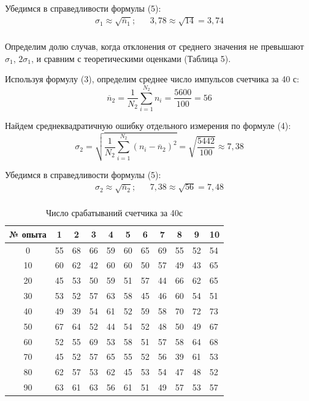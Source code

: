 \documentclass[a4paper,12pt]{article} %
\begin{document}
Убедимся в справедливости формулы (5):
\[
\begin{aligned}
\sigma_1 \approx \sqrt{\overline{n}_1}; &  & 3,78 \approx \sqrt{14} = 3,74\\
\end{aligned}
\]

Определим долю случав, когда отклонения от среднего значения не превышают $\sigma_1$, $2\sigma_1$, и сравним с теоретическими оценками (Таблица 5).

Используя формулу (3), определим среднее число импульсов счетчика за 40 с:
\[\overline{n}_2 = \frac{1}{N_2}\sum_{i=1}^{N_2}n_i = \frac{5600}{100}=56\]

Найдем среднеквадратичную ошибку отдельного измерения по формуле (4):
\[\sigma_2 = \sqrt{\frac{1}{N_2}\sum_{i=1}^{N_2}(n_i-\overline{n}_2)^2}=\sqrt{\frac{5442}{100}} \approx 7,38\]

Убедимся в справедливости формулы (5):
\[
\begin{aligned}
\sigma_2 \approx \sqrt{\overline{n}_2}; &  & 7,38 \approx \sqrt{56} = 7,48\\
\end{aligned}
\]
\newpage
\begin{table}[h]
\centering
\caption{Число срабатываний счетчика за 40с}
\label{table 3}
\renewcommand{\tabcolsep}{2mm}
\begin{tabular}{|c|l|l|l|l|l|l|l|l|l|l|}
\hline
№ опыта & \multicolumn{1}{c|}{1} & \multicolumn{1}{c|}{2} & \multicolumn{1}{c|}{3} & \multicolumn{1}{c|}{4} & \multicolumn{1}{c|}{5} & \multicolumn{1}{c|}{6} & \multicolumn{1}{c|}{7} & \multicolumn{1}{c|}{8} & \multicolumn{1}{c|}{9} & \multicolumn{1}{c|}{10} \\ \hline
0  & 55 & 68 & 66 & 59 & 60 & 65 & 69 & 55 & 52 & 54 \\ \hline
10 & 60 & 62 & 42 & 60 & 60 & 50 & 57 & 49 & 43 & 65 \\ \hline
20 & 45 & 53 & 50 & 59 & 51 & 57 & 44 & 66 & 62 & 65 \\ \hline
30 & 53 & 52 & 57 & 63 & 58 & 45 & 46 & 60 & 54 & 51 \\ \hline
40 & 49 & 39 & 54 & 61 & 52 & 59 & 58 & 70 & 72 & 73 \\ \hline
50 & 67 & 64 & 52 & 44 & 54 & 52 & 48 & 50 & 49 & 67 \\ \hline
60 & 52 & 55 & 69 & 53 & 58 & 51 & 57 & 58 & 64 & 68 \\ \hline
70 & 45 & 52 & 57 & 65 & 55 & 52 & 56 & 39 & 61 & 53 \\ \hline
80 & 62 & 57 & 53 & 62 & 45 & 53 & 54 & 47 & 48 & 52 \\ \hline
90 & 63 & 61 & 63 & 56 & 61 & 51 & 49 & 57 & 53 & 57 \\ \hline
\end{tabular}
\end{table}
\end{document}
